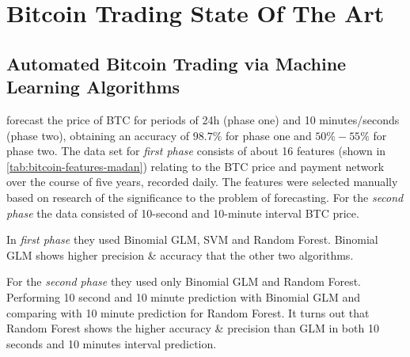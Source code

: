 
\chapter{Bitcoin Trading State Of The Art} %

\label{ch:bitcoin-trading-state-of-the-art}


\section[\cite{madan_automated_2014}] {Automated Bitcoin Trading
  via Machine Learning Algorithms}

\label{sec:automated-bitcoin-trading-via-machine-learning-algorithms}

\cite{madan_automated_2014} forecast the price of BTC for periods
of 24h (phase one) and 10 minutes/seconds (phase two), obtaining an
accuracy of $98.7\%$
for phase one and $50\% - 55\%$
for phase two. The data set for \textit{first phase} consists of about
16 features (shown in \autoref{tab:bitcoin-features-madan}) relating
to the BTC price and payment network over the course of five years,
recorded daily. The features were selected manually based on research
of the significance to the problem of forecasting. For the
\textit{second phase} the data consisted of 10-second and 10-minute
interval BTC price.

In \textit{first phase} they used Binomial GLM, SVM and Random Forest.
Binomial GLM shows higher precision \& accuracy that the other two
algorithms.

For the \textit{second phase} they used only Binomial GLM and Random
Forest. Performing 10 second and 10 minute prediction with Binomial
GLM and comparing with 10 minute prediction for Random Forest. It
turns out that Random Forest shows the higher accuracy \& precision
than GLM in both 10 seconds and 10 minutes interval prediction.

